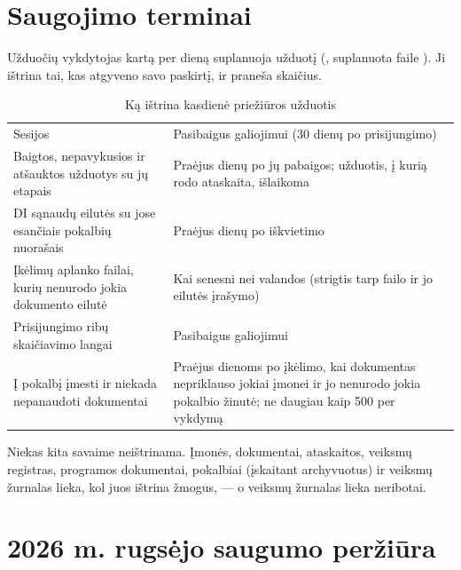 \section{Saugojimo terminai}\label{sec:security:retention}

Užduočių vykdytojas kartą per dieną suplanuoja užduotį 
(, suplanuota faile ). Ji ištrina tai, kas
atgyveno savo paskirtį, ir praneša skaičius.

\begin{table}[H]
\caption{Ką ištrina kasdienė priežiūros užduotis}\label{tab:security:retention}
\begin{tabularx}{\textwidth}{@{}L{48mm}Y@{}}
\toprule
{} &  \\
\midrule
Sesijos & Pasibaigus galiojimui (30 dienų po prisijungimo) \\
Baigtos, nepavykusios ir atšauktos užduotys su jų etapais & Praėjus  \code{=}  dienų po jų pabaigos; užduotis, į kurią rodo ataskaita, išlaikoma \\
DI sąnaudų eilutės su jose esančiais pokalbių nuorašais & Praėjus  \code{=}  dienų po iškvietimo \\
Įkėlimų aplanko failai, kurių nenurodo jokia dokumento eilutė & Kai senesni nei  \code{=}  valandos (strigtis tarp failo ir jo eilutės įrašymo) \\
Prisijungimo ribų skaičiavimo langai & Pasibaigus galiojimui \\
Į pokalbį įmesti ir niekada nepanaudoti dokumentai & Praėjus  \code{=}  dienoms po įkėlimo, kai dokumentas nepriklauso jokiai įmonei ir jo nenurodo jokia pokalbio žinutė; ne daugiau kaip 500 per vykdymą \\
\bottomrule
\end{tabularx}
\end{table}

Niekas kita savaime neištrinama. Įmonės, dokumentai, ataskaitos, veiksmų registras, programos
dokumentai, pokalbiai (įskaitant archyvuotus) ir veiksmų žurnalas lieka, kol juos ištrina
žmogus, --- o veiksmų žurnalas lieka neribotai.


\section{2026 m. rugsėjo saugumo peržiūra}\label{sec:security:review}

